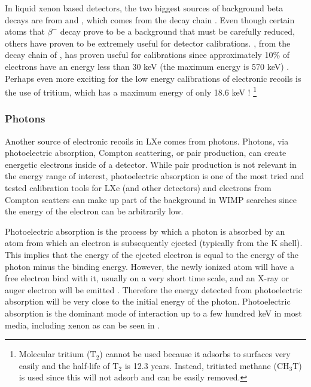 In liquid xenon based detectors, the two biggest sources of background beta decays are from  and , which comes from the  decay chain \cite{aprile2017first}.  Even though certain atoms that $\beta^-$ decay prove to be a background that must be carefully reduced, others have proven to be extremely useful for detector calibrations.  , from the decay chain of ,  has proven useful for calibrations since approximately 10\% of electrons have an energy less than 30 keV (the maximum energy is 570 keV) \cite{aprile2017radon}.  Perhaps even more exciting for the low energy calibrations of electronic recoils is the use of tritium, which has a maximum energy of only 18.6 keV \cite{akerib2016tritium, aprile2017tritium}! \footnote{Molecular tritium ($\textrm{T}_2$) cannot be used because it adsorbs to surfaces very easily and the half-life of $\textrm{T}_2$ is 12.3 years.  Instead, tritiated methane ($\textrm{CH}_3\textrm{T}$) is used since this will not adsorb and can be easily removed.}  

\subsubsection{Photons}

Another source of electronic recoils in LXe comes from photons.  Photons, via photoelectric absorption, Compton scattering, or pair production, can create energetic electrons inside of a detector.  While pair production is not relevant in the energy range of interest, photoelectric absorption is one of the most tried and tested calibration tools for LXe (and other detectors) and electrons from Compton scatters can make up part of the background in WIMP searches since the energy of the electron can be arbitrarily low.

Photoelectric absorption is the process by which a photon is absorbed by an atom from which an electron is subsequently ejected (typically from the K shell).  This implies that the energy of the ejected electron is equal to the energy of the photon minus the binding energy.  However, the newly ionized atom will have a free electron bind with it, usually on a very short time scale, and an X-ray or auger electron will be emitted \cite{knoll2010radiation}.  Therefore the energy detected from photoelectric absorption will be very close to the initial energy of the photon.  Photoelectric absorption is the dominant mode of interaction up to a few hundred keV in most media, including xenon as can be seen in .  

